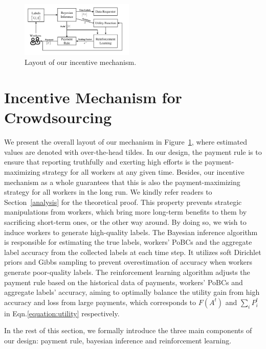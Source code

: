 \begin{figure}[t]
 	\centering
	\includegraphics[width=0.48\textwidth]{image/Architecture}
	\vspace*{-8mm}
    \caption{\label{figure:layout} Layout of our incentive mechanism.}
\end{figure}
\section{Incentive Mechanism for Crowdsourcing}
We present the overall layout of our mechanism in Figure~\ref{figure:layout}, where estimated values are denoted with over-the-head tildes. In our design, the payment rule is to ensure that reporting truthfully and exerting high efforts  is the payment-maximizing strategy for all workers at any given time. Besides, our incentive mechanism as a whole guarantees that this is also the payment-maximizing strategy for all workers in the long run. We kindly refer readers to Section~\ref{analysis} for the theoretical proof. This property prevents strategic manipulations from workers, which bring more long-term benefits to them by sacrificing short-term ones, or the other way around. 
By doing so, we wish to induce workers to generate high-quality labels. %
The Bayesian inference algorithm is responsible for estimating the true labels, workers' PoBCs and the aggregate label accuracy from the collected labels at each time step. It utilizes soft Dirichlet priors and Gibbs sampling to prevent overestimation of accuracy when workers generate poor-quality labels. The reinforcement learning algorithm adjusts the payment rule based on the historical data of payments, workers' PoBCs and aggregate labels' accuracy, aiming to optimally balance the utility gain from high accuracy and loss from large payments, which corresponds to $F(A^t)$ and $\sum_{i}P_i^t$ in Eqn.\ref{equation:utility} respectively.

In the rest of this section, we formally introduce the three main components of our design: payment rule, bayesian inference and reinforcement learning.

